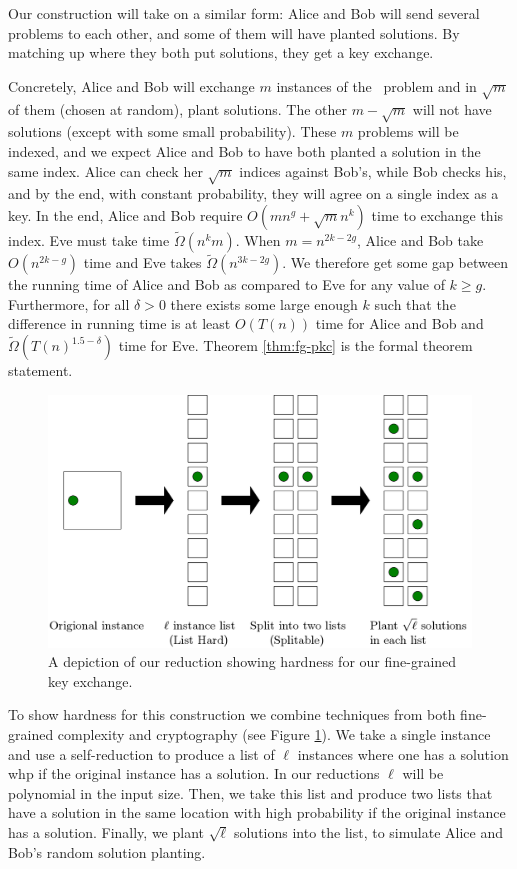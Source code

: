 Our construction will take on a similar form: Alice and Bob will send several problems to each other, and some of them will have planted solutions. By matching up where they both put solutions, they get a key exchange.

Concretely, Alice and Bob will exchange $m$ instances of the \zkclique~problem and in $\sqrt{m}$ of them (chosen at random), plant solutions. The other $m - \sqrt{m}$ will not have solutions (except with some small probability). These $m$ problems will be indexed, and we expect Alice and Bob to have both planted a solution in the same index. Alice can check her $\sqrt{m}$ indices against Bob's, while Bob checks his, and by the end, with constant probability, they will agree on a single index as a key. In the end, Alice and Bob require $O(mn^g + \sqrt{m}n^{k})$ time to exchange this index.  Eve must take time $\tilde{\Omega}(n^{k}m)$. When  $m = n^{2k-2g}$, Alice and Bob take $O(n^{2k-g})$ time and Eve takes $\tilde{\Omega}(n^{3k-2g})$. We therefore get some gap between the running time of Alice and Bob as compared to Eve for any value of $k\geq g$. Furthermore, for all $\delta>0$ there exists some large enough $k$ such that the difference in running time is at least $O(T(n))$ time for Alice and Bob and $\tilde{\Omega}(T(n)^{1.5-\delta})$ time for Eve. Theorem \ref{thm:fg-pkc} is the formal theorem statement.



\begin{figure}[h]
	\centering
	\includegraphics[scale=0.6]{fgcrypto/FullReduction.png}
	\caption{A depiction of our reduction showing hardness for our fine-grained key exchange.}
	\label{fig:wholeReductionBoxes}
\end{figure}

To show hardness for this construction we combine techniques from both fine-grained complexity and cryptography (see Figure \ref{fig:wholeReductionBoxes}). We take a single instance and use a self-reduction to produce a list of $\ell$ instances where one has a solution whp if the original instance has a solution. In our reductions $\ell$ will be polynomial in the input size. Then, we take this list and produce two lists that have a solution in the same location with high probability if the original instance has a solution. Finally, we plant $\sqrt{\ell}$ solutions into the list, to simulate Alice and Bob's random solution planting. 

